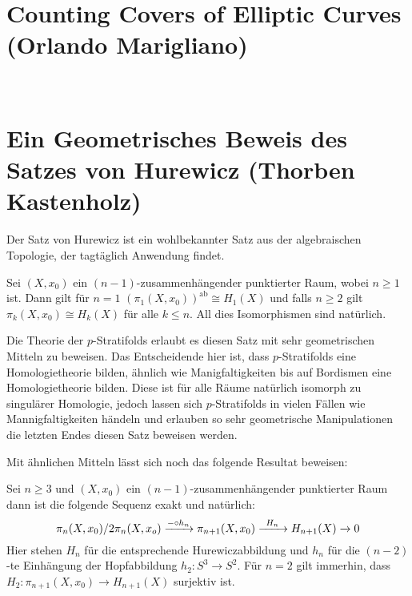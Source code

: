 \tableofcontents

\clearpage

\section{Counting Covers of Elliptic Curves (Orlando Marigliano)}

\ 

\section{Ein Geometrisches Beweis des Satzes von Hurewicz
(Thorben Kastenholz)}

Der Satz von Hurewicz ist ein wohlbekannter Satz aus der algebraischen
Topologie, der tagtäglich Anwendung findet.

\begin{satz}
Sei $(X,x_0)$ ein $(n-1)$-zusammenhängender punktierter Raum, wobei $n\geq 1$
ist. Dann gilt für $n=1$ $(\pi_1(X,x_0))^{\mathrm{ab}} \cong H_1(X)$ und falls
$n \geq 2$ gilt $\pi_k(X,x_0) \cong H_k(X)$ für alle $k\leq n$. All dies
Isomorphismen sind natürlich.
\end{satz}

Die Theorie der $p$-Stratifolds erlaubt es diesen Satz mit sehr geometrischen
Mitteln zu beweisen. Das Entscheidende hier ist, dass $p$-Stratifolds eine
Homologietheorie bilden, ähnlich wie Manigfaltigkeiten bis auf Bordismen eine
Homologietheorie bilden. Diese ist für alle Räume natürlich isomorph zu
singulärer Homologie, jedoch lassen sich $p$-Stratifolds in vielen Fällen wie
Mannigfaltigkeiten händeln und erlauben so sehr geometrische Manipulationen
die letzten Endes diesen Satz beweisen werden.

Mit ähnlichen Mitteln lässt sich noch das folgende Resultat beweisen:
\begin{satz}
Sei $n \geq 3$ und $(X,x_0)$ ein $(n-1)$-zusammenhängender punktierter Raum
dann ist die folgende Sequenz exakt und natürlich:
\[
\pi_n(X,x_0)/2\pi_n(X,x_o) \xrightarrow{- \circ h_n} \pi_{n+1}(X,x_0)
\xrightarrow{\hspace{1ex} H_n \hspace{1ex}} H_{n+1}(X) \xrightarrow{} 0
\]
Hier stehen $H_n$ für die entsprechende Hurewiczabbildung und $h_n$ für die
$(n-2)$-te Einhängung der Hopfabbildung $h_2 \colon S^3 \to S^2$. Für $n = 2$
gilt immerhin, dass $H_2 \colon \pi_{n+1}(X,x_0) \to H_{n+1}(X)$ surjektiv ist.
\end{satz}

